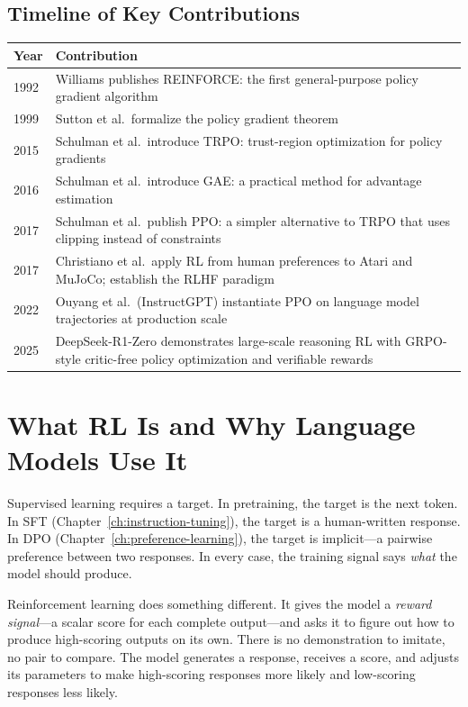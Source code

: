 \subsection*{Timeline of Key Contributions}

\begin{center}
\begin{tabularx}{\textwidth}{@{}lX@{}}
\toprule
\textbf{Year} & \textbf{Contribution} \\
\midrule
1992 & Williams publishes REINFORCE: the first general-purpose policy gradient algorithm \\
1999 & Sutton et al.\ formalize the policy gradient theorem \\
2015 & Schulman et al.\ introduce TRPO: trust-region optimization for policy gradients \\
2016 & Schulman et al.\ introduce GAE: a practical method for advantage estimation \\
2017 & Schulman et al.\ publish PPO: a simpler alternative to TRPO that uses clipping instead of constraints \\
2017 & Christiano et al.\ apply RL from human preferences to Atari and MuJoCo; establish the RLHF paradigm \\
2022 & Ouyang et al.\ (InstructGPT) instantiate PPO on language model trajectories at production scale \\
2025 & DeepSeek-R1-Zero demonstrates large-scale reasoning RL with GRPO-style critic-free policy optimization and verifiable rewards \\
\bottomrule
\end{tabularx}
\end{center}


\section{What RL Is and Why Language Models Use It}
\label{sec:why-rl}

Supervised learning requires a target. In pretraining, the target is the next token. In SFT (Chapter~\ref{ch:instruction-tuning}), the target is a human-written response. In DPO (Chapter~\ref{ch:preference-learning}), the target is implicit---a pairwise preference between two responses. In every case, the training signal says \emph{what} the model should produce.

Reinforcement learning does something different. It gives the model a \emph{reward signal}---a scalar score for each complete output---and asks it to figure out how to produce high-scoring outputs on its own. There is no demonstration to imitate, no pair to compare. The model generates a response, receives a score, and adjusts its parameters to make high-scoring responses more likely and low-scoring responses less likely.

